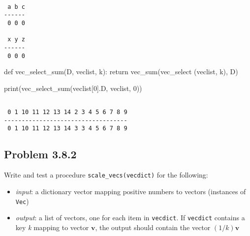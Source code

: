\documentclass[
  letterpaper,
  DIV=11,
  numbers=noendperiod]{scrartcl}
\newenvironment{Shaded}{\begin{snugshade}}{\end{snugshade}}
\newcommand{\BuiltInTok}[1]{\textcolor[rgb]{0.00,0.23,0.31}{#1}}
\newcommand{\ControlFlowTok}[1]{\textcolor[rgb]{0.00,0.23,0.31}{#1}}
\newcommand{\DecValTok}[1]{\textcolor[rgb]{0.68,0.00,0.00}{#1}}
\newcommand{\KeywordTok}[1]{\textcolor[rgb]{0.00,0.23,0.31}{#1}}
\newcommand{\NormalTok}[1]{\textcolor[rgb]{0.00,0.23,0.31}{#1}}
\providecommand{\tightlist}{%
  \setlength{\itemsep}{0pt}\setlength{\parskip}{0pt}}\usepackage{longtable,booktabs,array}
\begin{document}
\begin{lstlisting}

 a b c
------
 0 0 0

 x y z
------
 0 0 0
\end{lstlisting}

\begin{Shaded}
\begin{Highlighting}[numbers=left,,]
\KeywordTok{def}\NormalTok{ vec\_select\_sum(D, veclist, k):}
    \ControlFlowTok{return}\NormalTok{ vec\_sum(vec\_select (veclist, k), D)}

\BuiltInTok{print}\NormalTok{(vec\_select\_sum(veclist[}\DecValTok{0}\NormalTok{].D, veclist, }\DecValTok{0}\NormalTok{))}
\end{Highlighting}
\end{Shaded}

\begin{lstlisting}

 0 1 10 11 12 13 14 2 3 4 5 6 7 8 9
-----------------------------------
 0 1 10 11 12 13 14 3 3 4 5 6 7 8 9
\end{lstlisting}

\newpage{}

\hypertarget{problem-3.8.2}{%
\subsection{Problem 3.8.2}\label{problem-3.8.2}}

Write and test a procedure \texttt{scale\_vecs(vecdict)} for the
following:

\begin{itemize}
\tightlist
\item
  \emph{input}: a dictionary vector mapping positive numbers to vectors
  (instances of \texttt{Vec})
\item
  \emph{output}: a list of vectors, one for each item in
  \texttt{vecdict}. If \texttt{vecdict} contains a key \emph{k} mapping
  to vector \(\bm{v}\), the output should contain the vector
  \((1/k)\bm{v}\)
\end{itemize}
\end{document}
